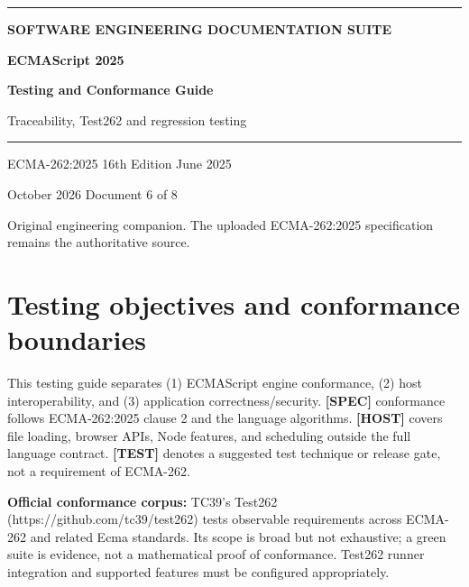 \documentclass[11pt,letterpaper]{article}
\begin{document}
\hypersetup{pageanchor=false}%
\begin{titlepage}
\thispagestyle{empty}
\vspace*{2.8cm}
{\color{Gold}\rule{18mm}{3pt}}\par\vspace{18mm}
{\sffamily\Large\bfseries\color{Teal} SOFTWARE ENGINEERING DOCUMENTATION SUITE}\par
\vspace{8mm}
{\sffamily\huge\bfseries\color{DeepNavy} ECMAScript 2025 }\par
\vspace{4mm}
{\sffamily\fontsize{24}{29}\selectfont\bfseries\color{DeepNavy} Testing and Conformance Guide }\par
\vspace{10mm}
{\large\color{Slate} Traceability, Test262 and regression testing }\par
\vspace{16mm}
{\color{Teal}\rule{\textwidth}{0.8pt}}\par
\vfill
{\sffamily\color{Slate}\large ECMA-262:2025 \textbullet{} 16th Edition \textbullet{} June 2025}\par
\vspace{3mm}
{\sffamily\color{Slate} October 2026 \textbullet{} Document 6 of 8}\par
\vspace{3mm}
{\small\color{Slate} Original engineering companion. The uploaded ECMA-262:2025 specification remains the authoritative source.}\par
\end{titlepage}\hypersetup{pageanchor=true}
\tableofcontents
\clearpage
\section{Testing objectives and conformance boundaries}\label{testing-objectives-and-conformance-boundaries}

This testing guide separates (1) ECMAScript engine conformance, (2) host interoperability, and (3) application correctness/security. \textbf{{[}SPEC{]}} conformance follows ECMA-262:2025 clause 2 and the language algorithms. \textbf{{[}HOST{]}} covers file loading, browser APIs, Node features, and scheduling outside the full language contract. \textbf{{[}TEST{]}} denotes a suggested test technique or release gate, not a requirement of ECMA-262.

\textbf{Official conformance corpus:} TC39's Test262 (https://github.com/tc39/test262) tests observable requirements across ECMA-262 and related Ecma standards. Its scope is broad but not exhaustive; a green suite is evidence, not a mathematical proof of conformance. Test262 runner integration and supported features must be configured appropriately.
\end{document}
